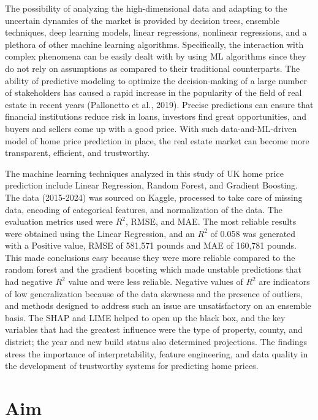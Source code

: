 \documentclass[12pt, a4paper, oneside]{book}
\begin{document}
The possibility of analyzing the high-dimensional data and adapting to the uncertain dynamics of the market is provided by decision trees, ensemble techniques, deep learning models, linear regressions, nonlinear regressions, and a plethora of other machine learning algorithms. Specifically, the interaction with complex phenomena can be easily dealt with by using ML algorithms since they do not rely on assumptions as compared to their traditional counterparts. The ability of predictive modeling to optimize the decision-making of a large number of stakeholders has caused a rapid increase in the popularity of the field of real estate in recent years (Pallonetto et al., 2019). Precise predictions can ensure that financial institutions reduce risk in loans, investors find great opportunities, and buyers and sellers come up with a good price. With such data-and-ML-driven model of home price prediction in place, the real estate market can become more transparent, efficient, and trustworthy.

The machine learning techniques analyzed in this study of UK home price prediction include Linear Regression, Random Forest, and Gradient Boosting. The data (2015-2024) was sourced on Kaggle, processed to take care of missing data, encoding of categorical features, and normalization of the data. The evaluation metrics used were $R^2$, RMSE, and MAE. The most reliable results were obtained using the Linear Regression, and an $R^2$ of 0.058 was generated with a Positive value, RMSE of 581,571 pounds and MAE of 160,781 pounds. This made conclusions easy because they were more reliable compared to the random forest and the gradient boosting which made unstable predictions that had negative $R^2$ value and were less reliable. Negative values of $R^2$ are indicators of low generalization because of the data skewness and the presence of outliers, and methods designed to address such an issue are unsatisfactory on an ensemble basis. The SHAP and LIME helped to open up the black box, and the key variables that had the greatest influence were the type of property, county, and district; the year and new build status also determined projections. The findings stress the importance of interpretability, feature engineering, and data quality in the development of trustworthy systems for predicting home prices.


\section{Aim}
\end{document}
